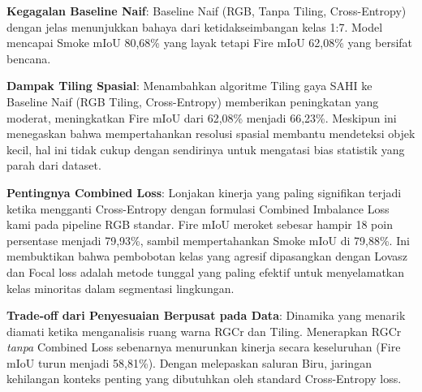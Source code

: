 \documentclass[conference]{IEEEtran}
\begin{document}
\begin{table}[htbp]
\caption{Studi Ablasional pada Set Pengujian FIgLib (PIDNet-M)}
\centering
{}
\label{tab:ablation}
\end{table}

\textbf{Kegagalan Baseline Naif}: Baseline Naif (RGB, Tanpa Tiling, Cross-Entropy) dengan jelas menunjukkan bahaya dari ketidakseimbangan kelas 1:7. Model mencapai Smoke mIoU 80,68\% yang layak tetapi Fire mIoU 62,08\% yang bersifat bencana. 

\textbf{Dampak Tiling Spasial}: Menambahkan algoritme Tiling gaya SAHI ke Baseline Naif (RGB Tiling, Cross-Entropy) memberikan peningkatan yang moderat, meningkatkan Fire mIoU dari 62,08\% menjadi 66,23\%. Meskipun ini menegaskan bahwa mempertahankan resolusi spasial membantu mendeteksi objek kecil, hal ini tidak cukup dengan sendirinya untuk mengatasi bias statistik yang parah dari dataset.

\textbf{Pentingnya Combined Loss}: Lonjakan kinerja yang paling signifikan terjadi ketika mengganti Cross-Entropy dengan formulasi Combined Imbalance Loss kami pada pipeline RGB standar. Fire mIoU meroket sebesar hampir 18 poin persentase menjadi 79,93\%, sambil mempertahankan Smoke mIoU di 79,88\%. Ini membuktikan bahwa pembobotan kelas yang agresif dipasangkan dengan Lovasz dan Focal loss adalah metode tunggal yang paling efektif untuk menyelamatkan kelas minoritas dalam segmentasi lingkungan.

\textbf{Trade-off dari Penyesuaian Berpusat pada Data}: Dinamika yang menarik diamati ketika menganalisis ruang warna RGCr dan Tiling. Menerapkan RGCr \textit{tanpa} Combined Loss sebenarnya menurunkan kinerja secara keseluruhan (Fire mIoU turun menjadi 58,81\%). Dengan melepaskan saluran Biru, jaringan kehilangan konteks penting yang dibutuhkan oleh standard Cross-Entropy loss. 
\end{document}
